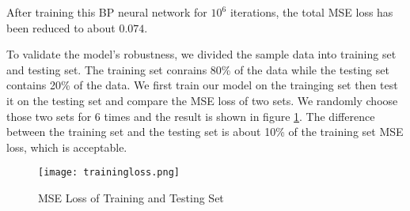 After training this BP neural network for $10^6$ iterations, the total MSE loss has been reduced to about $0.074$.

To validate the model's robustness, we divided the sample data into training set and testing set. The training set conrains 80\% of the data while the testing set contains 20\% of the data. We first train our model on the trainging set then test it on the testing set and compare the MSE loss of two sets. We randomly choose those two sets for 6 times and the result is shown in figure \ref{Train Set}. The difference between the training set and the testing set is about 10\% of the training set MSE loss, which is acceptable.

\begin{figure}[H]
    \centering
    \texttt{[image: trainingloss.png]}
    \caption{MSE Loss of Training and Testing Set}
    \label{Train Set}
\end{figure}
